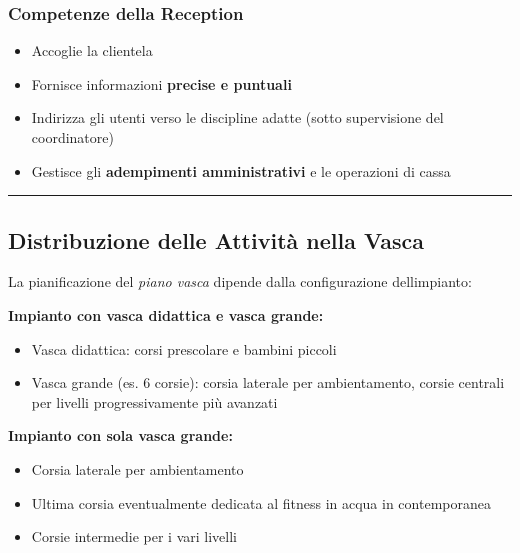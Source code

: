 \documentclass[a4paper,11pt]{article}
\providecommand{\tightlist}{%
  \setlength{\itemsep}{0pt}\setlength{\parskip}{0pt}}
\begin{document}
\subsubsection{Competenze della
      Reception}\label{competenze-della-reception}

\begin{itemize}
      \tightlist
      \item
            Accoglie la clientela
      \item
            Fornisce informazioni \textbf{precise e puntuali}
      \item
            Indirizza gli utenti verso le discipline adatte (sotto supervisione
            del coordinatore)
      \item
            Gestisce gli \textbf{adempimenti amministrativi} e le operazioni di
            cassa
\end{itemize}

\begin{center}\rule{0.5\linewidth}{0.5pt}\end{center}

\subsection{Distribuzione delle Attività nella
      Vasca}\label{distribuzione-delle-attivituxe0-nella-vasca}

La pianificazione del \emph{piano vasca} dipende dalla configurazione
dell\textquotesingle impianto:

\textbf{Impianto con vasca didattica e vasca grande:}

\begin{itemize}
      \tightlist
      \item
            Vasca didattica: corsi prescolare e bambini piccoli
      \item
            Vasca grande (es. 6 corsie): corsia laterale per ambientamento, corsie
            centrali per livelli progressivamente più avanzati
\end{itemize}

\textbf{Impianto con sola vasca grande:}

\begin{itemize}
      \tightlist
      \item
            Corsia laterale per ambientamento
      \item
            Ultima corsia eventualmente dedicata al fitness in acqua in
            contemporanea
      \item
            Corsie intermedie per i vari livelli
\end{itemize}
\end{document}
